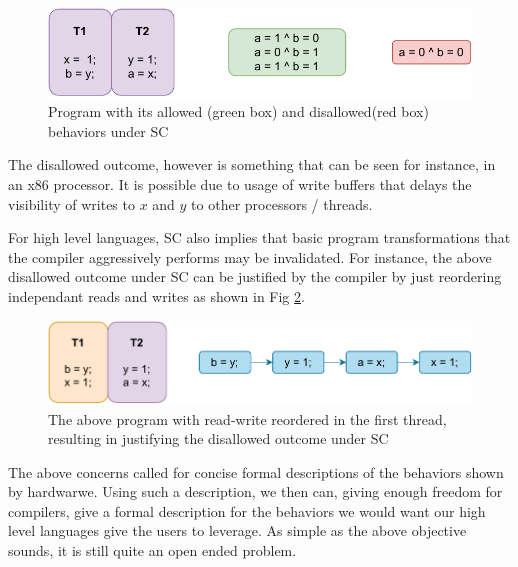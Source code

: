 \documentclass{article}
\begin{document}
        \begin{figure}
            \centering
            \includegraphics[scale=0.7]{WriteBuffer.pdf}
            \caption{Program with its allowed (green box) and disallowed(red box) behaviors under SC}
            \label{Fig1}
        \end{figure} 

        The disallowed outcome, however is something that can be seen for instance, in an x86 processor. 
        It is possible due to usage of write buffers that delays the visibility of writes to $x$ and $y$ to other processors / threads.

        For high level languages, SC also implies that basic program transformations that the compiler aggressively performs may be invalidated. 
        For instance, the above disallowed outcome under SC can be justified by the compiler by just reordering independant reads and writes as shown in Fig \ref{Fig2}.

        \begin{figure}
            \centering
            \includegraphics[scale=0.7]{ReadWriteReord.pdf}
            \caption{The above program with read-write reordered in the first thread, resulting in justifying the disallowed outcome under SC}
            \label{Fig2}
        \end{figure} 

        The above concerns called for concise formal descriptions of the behaviors shown by hardwarwe. Using such a description, we then can, giving enough freedom for compilers, give a formal description for the behaviors we would want our high level languages give the users to leverage.
        As simple as the above objective sounds, it is still quite an open ended problem.
\end{document}
